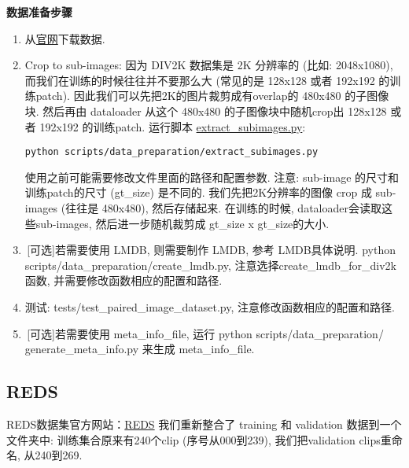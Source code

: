 \documentclass[../main.tex]{subfiles}
\begin{document}
\noindent\textbf{数据准备步骤}
\begin{enumerate}
\item 从\href{https://data.vision.ee.ethz.ch/cvl/DIV2K}{官网}下载数据.
\item Crop to sub-images: 因为 DIV2K 数据集是 2K 分辨率的 (比如: 2048x1080), 而我们在训练的时候往往并不要那么大 (常见的是 128x128 或者 192x192 的训练patch). 因此我们可以先把2K的图片裁剪成有overlap的 480x480 的子图像块. 然后再由 dataloader 从这个 480x480 的子图像块中随机crop出 128x128 或者 192x192 的训练patch.
运行脚本 \href{https://github.com/XPixelGroup/BasicSR/blob/master/scripts/data_preparation/extract_subimages.py}{extract\_subimages.py}:
\begin{verbatim}
python scripts/data_preparation/extract_subimages.py
\end{verbatim}
使用之前可能需要修改文件里面的路径和配置参数. 注意: sub-image 的尺寸和训练patch的尺寸 (gt\_size) 是不同的. 我们先把2K分辨率的图像 crop 成 sub-images (往往是 480x480), 然后存储起来. 在训练的时候, dataloader会读取这些sub-images, 然后进一步随机裁剪成 gt\_size x gt\_size的大小.
\item\,[可选]若需要使用 LMDB, 则需要制作 LMDB, 参考 LMDB具体说明. python scripts/data\_preparation/create\_lmdb.py, 注意选择create\_lmdb\_for\_div2k函数, 并需要修改函数相应的配置和路径.
\item 测试: tests/test\_paired\_image\_dataset.py, 注意修改函数相应的配置和路径.
\item\,[可选]若需要使用 meta\_info\_file, 
运行 python scripts/data\_preparation/\\generate\_meta\_info.py 来生成 meta\_info\_file.
\end{enumerate}


\subsection{REDS}
REDS数据集官方网站：\href{https://seungjunnah.github.io/Datasets/reds.html}{REDS}
我们重新整合了 training 和 validation 数据到一个文件夹中: 训练集合原来有240个clip (序号从000到239), 我们把validation clips重命名, 从240到269.\\
\end{document}
